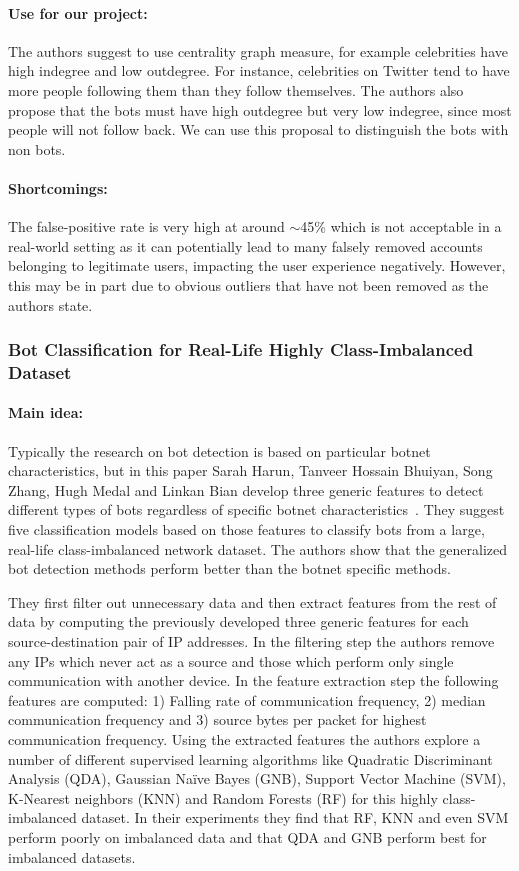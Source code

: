 \paragraph{Use for our project:}
The authors suggest to use centrality graph measure, for example celebrities have high indegree and low outdegree. For instance, celebrities on Twitter tend to have more people following them than they follow themselves. The authors also propose that the bots must have high outdegree but very low indegree, since most people will not follow back. We can use this proposal to distinguish the bots with non bots. ~\cite{cornelissen2018network}

\paragraph{Shortcomings:}
The false-positive rate is very high at around $\sim$45\% which is not acceptable in a real-world setting as it can potentially lead to many falsely removed accounts belonging to legitimate users, impacting the user experience negatively. However, this may be in part due to obvious outliers that have not been removed as the authors state. 


\subsubsection{Bot Classification for Real-Life Highly Class-Imbalanced Dataset}

\paragraph{Main idea:}
Typically the research on bot detection is based on particular botnet characteristics, but in this paper Sarah Harun, Tanveer Hossain Bhuiyan, Song Zhang, Hugh Medal and Linkan Bian develop three generic features to detect different types of bots regardless of specific botnet characteristics~\cite{harun2017bot}. They suggest five classification models based on those features to classify bots from a large, real-life class-imbalanced network dataset. The authors show that the generalized bot detection methods perform better than the botnet specific methods.

They first filter out unnecessary data and then extract features from the rest of data by computing the previously developed three generic features for each source-destination pair of IP addresses. In the filtering step the authors remove any IPs which never act as a source and those which perform only single communication with another device. In the feature extraction step the following features are computed: 1) Falling rate of communication frequency, 2) median communication frequency and 3) source bytes per packet for highest communication frequency. Using the extracted features the authors explore a number of different supervised learning algorithms like Quadratic Discriminant Analysis (QDA), Gaussian Naïve Bayes (GNB), Support Vector Machine (SVM), K-Nearest neighbors (KNN) and Random Forests (RF) for this highly class-imbalanced dataset. In their experiments they find that RF, KNN and even SVM perform poorly on imbalanced data and that QDA and GNB perform best for imbalanced datasets.

